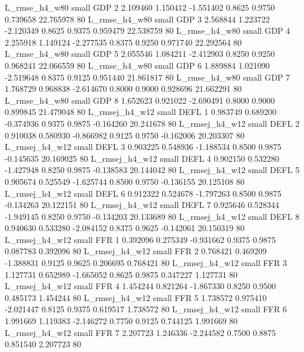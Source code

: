  L_rmse_h4_w80      small      GDP                 2 2.109460 1.150412 -1.551402 0.8625 0.9750  0.739658   22.765978 80
 L_rmse_h4_w80      small      GDP                 3 2.568844 1.223722 -2.120349 0.8625 0.9375  0.959479   22.538759 80
 L_rmse_h4_w80      small      GDP                 4 2.255918 1.149124 -2.277535 0.8375 0.9250  0.971740   22.292564 80
 L_rmse_h4_w80      small      GDP                 5 2.055546 1.084211 -2.412903 0.8250 0.9250  0.968241   22.066559 80
 L_rmse_h4_w80      small      GDP                 6 1.889884 1.021090 -2.519648 0.8375 0.9125  0.951440   21.861817 80
 L_rmse_h4_w80      small      GDP                 7 1.768729 0.968838 -2.614670 0.8000 0.9000  0.928696   21.662291 80
 L_rmse_h4_w80      small      GDP                 8 1.652623 0.921022 -2.690491 0.8000 0.9000  0.899845   21.479048 80
L_rmsej_h4_w12      small     DEFL                 1 0.983749 0.689200 -0.374936 0.9375 0.9875 -0.164260   20.241678 80
L_rmsej_h4_w12      small     DEFL                 2 0.910038 0.580930 -0.866982 0.9125 0.9750 -0.162006   20.203307 80
L_rmsej_h4_w12      small     DEFL                 3 0.903225 0.548936 -1.188534 0.8500 0.9875 -0.145635   20.169025 80
L_rmsej_h4_w12      small     DEFL                 4 0.902150 0.532280 -1.427948 0.8250 0.9875 -0.138583   20.144042 80
L_rmsej_h4_w12      small     DEFL                 5 0.905674 0.525549 -1.625744 0.8500 0.9750 -0.136155   20.125108 80
L_rmsej_h4_w12      small     DEFL                 6 0.912322 0.524678 -1.797263 0.8500 0.9875 -0.134263   20.122151 80
L_rmsej_h4_w12      small     DEFL                 7 0.925646 0.528344 -1.949145 0.8250 0.9750 -0.134203   20.133689 80
L_rmsej_h4_w12      small     DEFL                 8 0.940630 0.533280 -2.084152 0.8375 0.9625 -0.142061   20.150319 80
L_rmsej_h4_w12      small      FFR                 1 0.392096 0.275349 -0.931662 0.9375 0.9875  0.087783    0.392096 80
L_rmsej_h4_w12      small      FFR                 2 0.768421 0.469209 -1.388831 0.9125 0.9625  0.206695    0.768421 80
L_rmsej_h4_w12      small      FFR                 3 1.127731 0.652989 -1.665052 0.8625 0.9875  0.347227    1.127731 80
L_rmsej_h4_w12      small      FFR                 4 1.454244 0.821264 -1.867330 0.8250 0.9500  0.485173    1.454244 80
L_rmsej_h4_w12      small      FFR                 5 1.738572 0.975410 -2.021447 0.8125 0.9375  0.619517    1.738572 80
L_rmsej_h4_w12      small      FFR                 6 1.991669 1.119383 -2.146272 0.7750 0.9125  0.744125    1.991669 80
L_rmsej_h4_w12      small      FFR                 7 2.207723 1.246336 -2.244582 0.7500 0.8875  0.851540    2.207723 80

